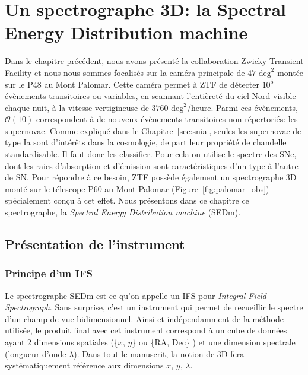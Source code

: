 \documentclass[../main/main.tex]{subfiles}
\begin{document}
\setcounter{chapter}{3}
\chapter{Un spectrographe 3D: la Spectral Energy Distribution machine}\label{ch:sedm}

\minitoc
\vspace{2cm}
Dans le chapitre précédent, nous avons présenté la collaboration Zwicky
Transient Facility et nous nous sommes focalisés sur la caméra
principale de $47\text{ deg}^{2}$ montée sur le P48 au Mont
Palomar. Cette caméra permet à ZTF de détecter $10^{5}$ évènements
transitoires ou variables, en scannant l'entièreté du ciel Nord visible
chaque nuit,  à la vitesse
vertigineuse de $3760\text{ deg}^{2}$/heure. Parmi ces évènements,
$\mathcal{O}(10)$ correspondent à de nouveux évènements transitoires non
répertoriés: les supernovae. Comme expliqué dans le
Chapitre~\ref{sec:snia}, seules les supernovae de type Ia sont
d'intérêts dans la cosmologie, de part leur propriété de chandelle
standardisable. Il faut donc les classifier. Pour cela on utilise le
spectre des SNe, dont les raies d'absorption et d'émission sont caractéristiques d'un
type à l'autre de SN. Pour répondre à ce besoin, ZTF possède également un spectrographe 3D
monté sur le télescope P60 au Mont Palomar
(Figure~\ref{fig:palomar_obs}) spécialement conçu à cet effet. Nous
présentons dans ce chapitre ce spectrographe, la \textit{Spectral Energy
Distribution machine} (SEDm).
\newpage

\section{Présentation de l'instrument}
\label{sec:ifs}

\subsection{Principe d'un IFS}
Le spectrographe SEDm est ce qu'on appelle un IFS pour \textit{Integral Field
Spectrograph}. Sans surprise, c'est un instrument qui permet de
recueillir le spectre d'un champ de vue bidimensionnel.
Ainsi et indépendamment de la méthode utilisée, le produit final avec
cet instrument correspond à
un cube de données ayant 2 dimensions spatiales (\{$x$, $y$\} ou \{RA,
Dec\} ) et une dimension spectrale (longueur d'onde $\lambda$). Dans tout le manuscrit, la notion de 3D fera
systématiquement référence aux dimensions \og $x$, $y$, $\lambda$\fg{}.
\end{document}
